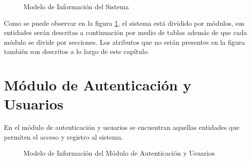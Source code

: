 
\begin{figure}[hbtp!]
	\begin{center}
		\caption{Modelo de Información del Sistema}
		\label{fig:mdi}
	\end{center}
\end{figure}
Como se puede observar en la figura \ref{fig:mdi}, el sistema está dividido por módulos, sus entidades serán descritas a continuación por medio de tablas además de que cada módulo se divide por secciones. Los atributos que no están presentes en la figura también son descritos a lo largo de este capítulo.

\section{Módulo de Autenticación y Usuarios}

En el módulo de autenticación y usuarios se encuentran aquellas entidades que permiten el acceso y registro al sistema.

\begin{figure}[hbtp!]
	\begin{center}
		\caption{Modelo de Información del Módulo de Autenticación y Usuarios}
		\label{fig:mdimau}
	\end{center}
\end{figure}

